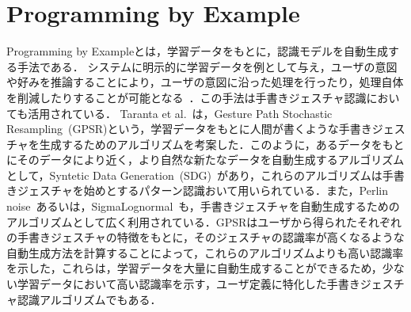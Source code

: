 \section{Programming by Example}
Programming by Exampleとは，学習データをもとに，認識モデルを自動生成する手法である．
システムに明示的に学習データを例として与え，ユーザの意図や好みを推論することにより，ユーザの意図に沿った処理を行ったり，処理自体を削減したりすることが可能となる~\cite{110003743975}．この手法は手書きジェスチャ認識においても活用されている．
Taranta et al.~\cite{Taranta:2016:RPA:2984511.2984525}は，Gesture Path Stochastic Resampling~(GPSR)という，学習データをもとに人間が書くような手書きジェスチャを生成するためのアルゴリズムを考案した．このように，あるデータをもとにそのデータにより近く，より自然な新たなデータを自動生成するアルゴリズムとして，Syntetic Data Generation~(SDG)~\cite{conf/iccv/NavaratnamFC07,Shotton:2011:RHP:2191740.2192047,Galbally_syntheticgeneration,Lundin:2002:SFD:646280.687684,Gatos:2005:SAK:1106779.1106876,Rodriguez-Serrano:2012:SQH:2240326.2240755,Fischer:2013:GLS:2501115.2501123}があり，これらのアルゴリズムは手書きジェスチャを始めとするパターン認識おいて用いられている．また，Perlin noise~\cite{Perlin:1985:IS:325165.325247}あるいは，SigmaLognormal~\cite{SigmaLognormal}も，手書きジェスチャを自動生成するためのアルゴリズムとして広く利用されている．GPSRはユーザから得られたそれぞれの手書きジェスチャの特徴をもとに，そのジェスチャの認識率が高くなるような自動生成方法を計算することによって，これらのアルゴリズムよりも高い認識率を示した，これらは，学習データを大量に自動生成することができるため，少ない学習データにおいて高い認識率を示す，ユーザ定義に特化した手書きジェスチャ認識アルゴリズムでもある．


